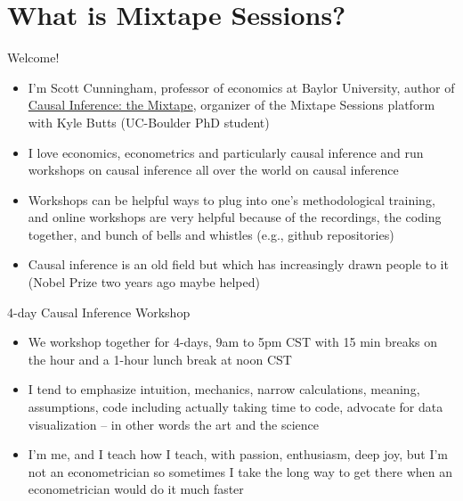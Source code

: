 \documentclass{beamer}
\begin{document}





\section{What is Mixtape Sessions?}


\begin{frame}{Welcome!}

  \begin{itemize}
	\item I'm Scott Cunningham, professor of economics at Baylor University, author of \underline{Causal Inference: the Mixtape}, organizer of the Mixtape Sessions platform with Kyle Butts (UC-Boulder PhD student)
	\item I love economics, econometrics and particularly causal inference and run workshops on causal inference all over the world on causal inference
	\item Workshops can be helpful ways to plug into one's methodological training, and online workshops are very helpful because of the recordings, the coding together, and bunch of bells and whistles (e.g., github repositories)
	\item Causal inference is an old field but which has increasingly drawn people to it (Nobel Prize two years ago maybe helped) 
  \end{itemize}

\end{frame}




\begin{frame}{4-day Causal Inference Workshop}

  \begin{itemize}
    \item We workshop together for 4-days, 9am to 5pm CST with 15 min breaks on the hour and a 1-hour lunch break at noon CST
    \item I tend to emphasize intuition, mechanics, narrow calculations, meaning, assumptions, code including actually taking time to code, advocate for data visualization -- in other words the art and the science
    \item I'm me, and I teach how I teach, with passion, enthusiasm, deep joy, but I'm not an econometrician so sometimes I take the long way to get there when an econometrician would do it much faster
  \end{itemize}

\end{frame}
\end{document}
